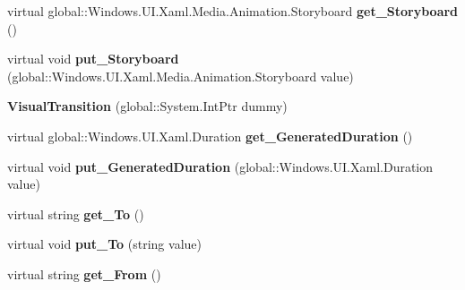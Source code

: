 \begin{DoxyCompactItemize}
\mbox{\label{class_windows_1_1_u_i_1_1_xaml_1_1_visual_transition_ad0e85cd4965feb0bae3084eee6e188dc}} 
virtual global\+::\+Windows.\+U\+I.\+Xaml.\+Media.\+Animation.\+Storyboard {\bfseries get\+\_\+\+Storyboard} ()
\item 
\mbox{\label{class_windows_1_1_u_i_1_1_xaml_1_1_visual_transition_a84345f3db3f81606783b0b0f12f011dd}} 
virtual void {\bfseries put\+\_\+\+Storyboard} (global\+::\+Windows.\+U\+I.\+Xaml.\+Media.\+Animation.\+Storyboard value)
\item 
\mbox{\label{class_windows_1_1_u_i_1_1_xaml_1_1_visual_transition_a8e9584c6562711665f737ddc44600c07}} 
{\bfseries Visual\+Transition} (global\+::\+System.\+Int\+Ptr dummy)
\item 
\mbox{\label{class_windows_1_1_u_i_1_1_xaml_1_1_visual_transition_afb0659e34cd42d916c1086d04558a288}} 
virtual global\+::\+Windows.\+U\+I.\+Xaml.\+Duration {\bfseries get\+\_\+\+Generated\+Duration} ()
\item 
\mbox{\label{class_windows_1_1_u_i_1_1_xaml_1_1_visual_transition_a9425580c95693c7ee3d33464e68ce83f}} 
virtual void {\bfseries put\+\_\+\+Generated\+Duration} (global\+::\+Windows.\+U\+I.\+Xaml.\+Duration value)
\item 
\mbox{\label{class_windows_1_1_u_i_1_1_xaml_1_1_visual_transition_a0b343e8c15ba3f404cb2f2152e2af0fb}} 
virtual string {\bfseries get\+\_\+\+To} ()
\item 
\mbox{\label{class_windows_1_1_u_i_1_1_xaml_1_1_visual_transition_aa76ac64a1c186e375fd07fbef846cefd}} 
virtual void {\bfseries put\+\_\+\+To} (string value)
\item 
\mbox{\label{class_windows_1_1_u_i_1_1_xaml_1_1_visual_transition_a9aa7c36d0dc60308cfeda62679c8e084}} 
virtual string {\bfseries get\+\_\+\+From} ()

\end{DoxyCompactItemize}
